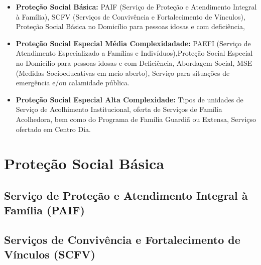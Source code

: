 \documentclass[
  brazilian]{report}
\begin{document}
\begin{itemize}
\item
  \textbf{Proteção Social Básica:} PAIF (Serviço de Proteção e
  Atendimento Integral à Família), SCFV (Serviços de Convivência e
  Fortalecimento de Vínculos), Proteção Social Básica no Domicílio para
  pessoas idosas e com deficiência,
\item
  \textbf{Proteção Social Especial Média Complexidadade:} PAEFI (Serviço
  de Atendimento Especializado a Famílias e Indivíduos),Proteção Social
  Especial no Domicílio para pessoas idosas e com Deficiência, Abordagem
  Social, MSE (Medidas Socioeducativas em meio aberto), Serviço para
  situações de emergência e/ou calamidade pública.
\item
  \textbf{Proteção Social Especial Alta Complexidade:} Tipos de unidades
  de Serviço de Acolhimento Institucional, oferta de Serviços de Família
  Acolhedora, bem como do Programa de Família Guardiã ou Extensa,
  Serviçso ofertado em Centro Dia.
\end{itemize}

\hypertarget{proteuxe7uxe3o-social-buxe1sica}{%
\section{Proteção Social Básica}\label{proteuxe7uxe3o-social-buxe1sica}}

\hypertarget{serviuxe7o-de-proteuxe7uxe3o-e-atendimento-integral-uxe0-famuxedlia-paif}{%
\subsection{Serviço de Proteção e Atendimento Integral à Família
(PAIF)}\label{serviuxe7o-de-proteuxe7uxe3o-e-atendimento-integral-uxe0-famuxedlia-paif}}

\hypertarget{serviuxe7os-de-convivuxeancia-e-fortalecimento-de-vuxednculos-scfv}{%
\subsection{Serviços de Convivência e Fortalecimento de Vínculos
(SCFV)}\label{serviuxe7os-de-convivuxeancia-e-fortalecimento-de-vuxednculos-scfv}}
\end{document}
